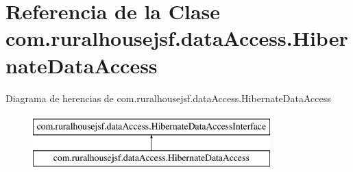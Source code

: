 \hypertarget{classcom_1_1ruralhousejsf_1_1data_access_1_1_hibernate_data_access}{}\section{Referencia de la Clase com.\+ruralhousejsf.\+data\+Access.\+Hibernate\+Data\+Access}
\label{classcom_1_1ruralhousejsf_1_1data_access_1_1_hibernate_data_access}
Diagrama de herencias de com.\+ruralhousejsf.\+data\+Access.\+Hibernate\+Data\+Access\begin{figure}[H]
\begin{center}
\leavevmode
\includegraphics[height=2.000000cm]{d9/d04/classcom_1_1ruralhousejsf_1_1data_access_1_1_hibernate_data_access}
\end{center}
\end{figure}
